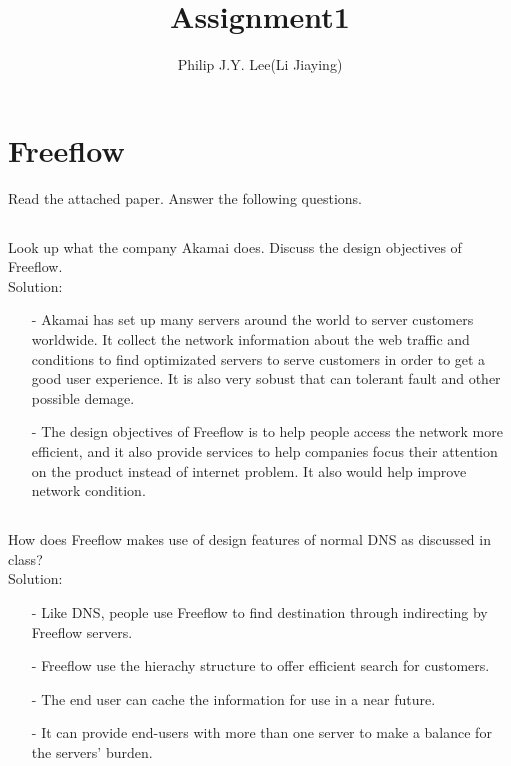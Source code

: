 \documentclass{article}
\begin{document}
\title{Assignment1}
\author{Philip J.Y. Lee(Li Jiaying)}
\maketitle

\section{Freeflow}
Read the attached paper. Answer the following questions.
\subsection{}
{Look up what the company Akamai does. Discuss the design objectives of Freeflow.}
\\
    Solution:
      \begin{enumerate}
      \item[-]Akamai has set up many servers around the world to server customers worldwide. It collect the network information about the web traffic and conditions to find optimizated servers to serve customers in order to get a good user experience. It is also very sobust that can tolerant fault and other possible demage.
      \item[-]The design objectives of Freeflow is to help people access the network more efficient, and it also provide services to help companies focus their attention on the product instead of internet problem. It also would help improve network condition.
\end{enumerate}
\subsection{}
{How does Freeflow makes use of design features of normal DNS as discussed in class?}
\\
    Solution:
      \begin{enumerate}
      \item[-]Like DNS, people use Freeflow to find destination through indirecting by Freeflow servers. 
      \item[-]Freeflow use the hierachy structure to offer efficient search for customers.
      \item[-]The end user can cache the information for use in a near future. 
      \item[-]It can provide end-users with more than one server to make a balance for the servers' burden. 
\end{enumerate}
\end{document}
